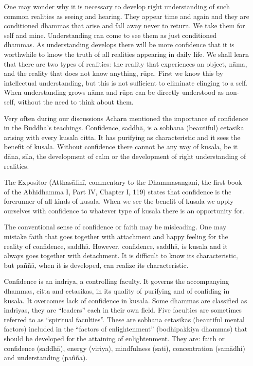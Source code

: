{{{{{{{{{{{One may wonder why it is necessary to
develop right understanding of such common realities as seeing and
hearing. They appear time and again and they are conditioned dhammas
that arise and fall away never to return. We take them for self and
mine. Understanding can come to see them as just conditioned dhammas. As
understanding develops there will be more confidence that it is
worthwhile to know the truth of all realities appearing in daily life.
We shall learn that there are two types of realities: the reality that
experiences an object, nāma, and the reality that does not know
anything, rūpa. First we know this by intellectual understanding, but
this is not sufficient to eliminate clinging to a self. When
understanding grows nāma and rūpa can be directly understood as
non-self, without the need to think about them. 

Very often during our discussions
Acharn mentioned the importance of confidence in the Buddha's teachings.
Confidence, saddhā, is a sobhana (beautiful) cetasika arising with every
kusala citta. It has purifying as characteristic and it sees the benefit
of kusala. Without confidence there cannot be any way of kusala, be it
dāna, sīla, the development of calm or the development of right
understanding of realities. 

The Expositor (Atthasālinī, commentary
to the Dhammasangani, the first book of the Abhidhamma I, Part IV,
Chapter I, 119) states that confidence is the forerunner of all kinds of
kusala. When we see the benefit of kusala we apply ourselves with
confidence to whatever type of kusala there is an opportunity for. 

The conventional sense of confidence or
faith may be misleading. One may mistake faith that goes together with
attachment and happy feeling for the reality of confidence, saddhā.
However, confidence, saddhā, is kusala and it always goes together with
detachment. It is difficult to know its characteristic, but paññā, when
it is developed, can realize its characteristic. 

Confidence is an indriya, a controlling
faculty. It governs the accompanying dhammas, citta and cetasikas, in
its quality of purifying and of confiding in kusala. It overcomes lack
of confidence in kusala. Some dhammas are classified as indriyas, they
are ``leaders'' each in their own field. Five faculties are sometimes
referred to as ``spiritual faculties''. These are sobhana cetasikas
(beautiful mental factors) included in the ``factors of enlightenment''
(bodhipakkiya dhammas) that should be developed for the attaining of
enlightenment. They are: faith or confidence (saddhā), energy (viriya),
mindfulness (sati), concentration (samādhi) and understanding (paññā).

}}}}}}}}}}}
